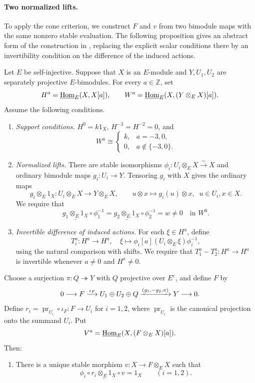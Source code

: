 \documentclass[11pt]{article}
\begin{document}
\paragraph{Two normalized lifts.}

To apply the cone criterion, we construct $F$ and $v$ from two bimodule maps with the same nonzero stable evaluation. The following proposition gives an abstract form of the construction in
\cite[Section~7.1]{O}, replacing the explicit scalar conditions there by an invertibility condition on the difference of the induced actions.

\begin{Prop}\label{frame:factory}
Let $E$ be self-injective. Suppose that $X$ is an $E$-module and $Y,U_1,U_2$ are separately projective $E$-bimodules. For every $a\in\mathbb{Z}$, set
\[
 H^a=\underline{{\rm Hom}}_E(X,X[a]),\qquad
 W^a=\underline{{\rm Hom}}_E(X,(Y\otimes_EX)[a]).
\]
Assume the following conditions.
\begin{enumerate}
\item \emph{Support conditions.}\label{frame:factory-support}
$H^0=k1_X$, $H^{-3}=H^{-2}=0$, and
\[
 W^a\cong
 \begin{cases}
 k,&a=-3,0,\\
 0,&a\notin\{-3,0\}.
 \end{cases}
\]

\item \emph{Normalized lifts.}\label{frame:factory-lifts}
There are stable isomorphisms
$\phi_i:U_i\otimes_EX\xrightarrow{\sim}X$
and ordinary bimodule maps $g_i:U_i\to Y$.
Tensoring $g_i$ with $X$ gives the ordinary maps
\[
 g_i\otimes_E1_X:U_i\otimes_EX\longrightarrow Y\otimes_EX,
 \qquad u\otimes x\longmapsto g_i(u)\otimes x,\;\; u\in U_i, x\in X.
\]
We require that
\[
 \underline{g_1\otimes_E1_X}\circ\phi_1^{-1}
 =\underline{g_2\otimes_E1_X}\circ\phi_2^{-1}
 =w\ne0
 \quad\text{in }W^0.
\]

\item \emph{Invertible difference of induced actions.}
\label{frame:factory-actions}
For each $\xi\in H^a$, define
$$T_i^a:H^a\to H^a,\quad \xi\mapsto \phi_i[a](U_i\otimes_E\xi)\phi_i^{-1},$$
using the natural comparison with shifts. We require that
$T_1^a-T_2^a:H^a\to H^a$ is invertible whenever $a\ne0$ and $H^a\ne0$.
\end{enumerate}

Choose a surjection $\pi:Q\twoheadrightarrow Y$ with $Q$
projective over $E^e$, and define $F$ by
\[
 0\longrightarrow F\stackrel{\iota_F}{\longrightarrow}U_1\oplus U_2\oplus Q
 \xrightarrow{(g_1,-g_2,\pi)}Y\longrightarrow0.
\]
Define $r_i=\operatorname{pr}_{U_i}\circ\iota_F:F\to U_i$ for $i=1,2$,
where $\operatorname{pr}_{U_i}$ is the canonical projection
onto the summand $U_i$. Put
$$V^a=\underline{{\rm Hom}}_E(X,(F\otimes_EX)[a]).$$
Then:
\begin{enumerate}
\item\label{frame:factory-normalized-class}
There is a unique stable morphism
$v:X\to F\otimes_EX$ such that
\[
 \phi_i\circ\underline{r_i\otimes_E1_X}\circ v=1_X
 \qquad(i=1,2).
\]


\end{enumerate}
\end{Prop}
\end{document}
